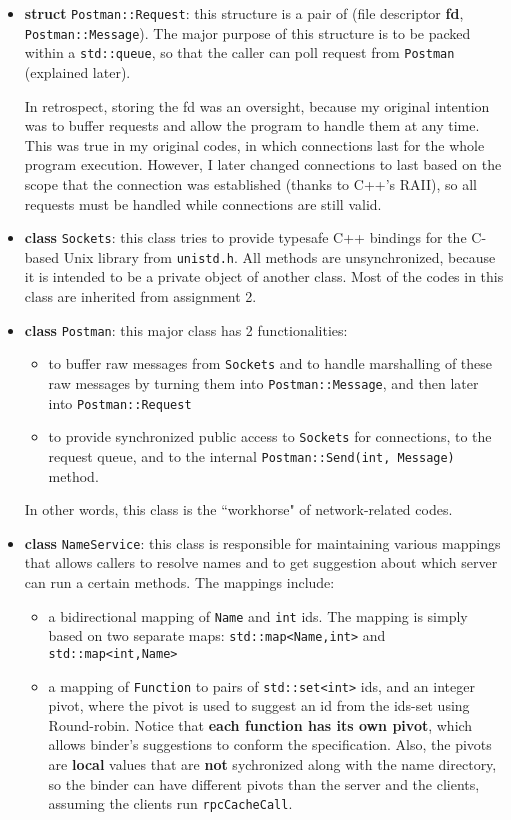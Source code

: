 \begin{itemize}
\item
{\bf struct} {\tt Postman::Request}: this structure is a pair of (file descriptor {\bf fd}, {\tt Postman::Message}).
The major purpose of this structure is to be packed within a {\tt std::queue}, so that the caller can poll request from {\tt Postman} (explained later).

In retrospect, storing the fd was an oversight, because my original intention was to buffer requests and allow the program to handle them at any time.
This was true in my original codes, in which connections last for the whole program execution.
However, I later changed connections to last based on the scope that the connection was established (thanks to C++'s RAII), so all requests must be handled while connections are still valid.

\item
{\bf class} {\tt Sockets}: this class tries to provide typesafe C++ bindings for the C-based Unix library from {\tt unistd.h}.
All methods are unsynchronized, because it is intended to be a private object of another class.
Most of the codes in this class are inherited from assignment 2.

\item
{\bf class} {\tt Postman}: this major class has 2 functionalities:
\begin{itemize}
\item
to buffer raw messages from {\tt Sockets} and to handle marshalling of these raw messages by turning them into {\tt Postman::Message}, and then later into {\tt Postman::Request}
\item
to provide synchronized public access to {\tt Sockets} for connections, to the request queue, and to the internal {\tt Postman::Send(int, Message)} method.
\end{itemize}

In other words, this class is the ``workhorse" of network-related codes.

\item
{\bf class} {\tt NameService}: this class is responsible for maintaining various mappings that allows callers to resolve names and to get suggestion about which server can run a certain methods.
The mappings include:
\begin{itemize}
\item
a bidirectional mapping of {\tt Name} and {\tt int} ids.
The mapping is simply based on two separate maps: {\tt std::map<Name,int>} and {\tt std::map<int,Name>}
\item
a mapping of {\tt Function} to pairs of {\tt std::set<int>} ids, and an integer pivot, where the pivot is used to suggest an id from the ids-set using Round-robin.
Notice that {\bf each function has its own pivot}, which allows binder's suggestions to conform the specification.
Also, the pivots are {\bf local} values that are {\bf not} sychronized along with the name directory, so the binder can have different pivots than the server and the clients, assuming the clients run {\tt rpcCacheCall}.
\end{itemize}


\end{itemize}
